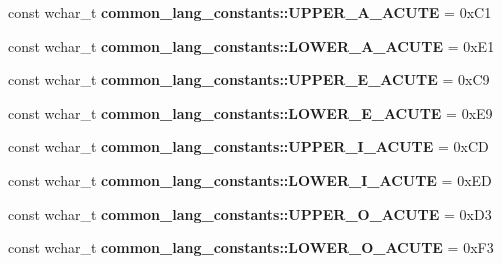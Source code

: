 \begin{DoxyCompactItemize}
\item 
\hypertarget{group___indexing_ga9d4b4564cfe020cc9a9e82f3f5fcd6e4}{const wchar\-\_\-t {\bfseries common\-\_\-lang\-\_\-constants\-::\-U\-P\-P\-E\-R\-\_\-\-A\-\_\-\-A\-C\-U\-T\-E} = 0x\-C1}\label{group___indexing_ga9d4b4564cfe020cc9a9e82f3f5fcd6e4}

\item 
\hypertarget{group___indexing_ga33013dda0d3a80f92d5761d7feb6b049}{const wchar\-\_\-t {\bfseries common\-\_\-lang\-\_\-constants\-::\-L\-O\-W\-E\-R\-\_\-\-A\-\_\-\-A\-C\-U\-T\-E} = 0x\-E1}\label{group___indexing_ga33013dda0d3a80f92d5761d7feb6b049}

\item 
\hypertarget{group___indexing_gae047dd18d206e1d8952572edc413043d}{const wchar\-\_\-t {\bfseries common\-\_\-lang\-\_\-constants\-::\-U\-P\-P\-E\-R\-\_\-\-E\-\_\-\-A\-C\-U\-T\-E} = 0x\-C9}\label{group___indexing_gae047dd18d206e1d8952572edc413043d}

\item 
\hypertarget{group___indexing_ga17d68cd5bb4adb01bbe928e64243b5a5}{const wchar\-\_\-t {\bfseries common\-\_\-lang\-\_\-constants\-::\-L\-O\-W\-E\-R\-\_\-\-E\-\_\-\-A\-C\-U\-T\-E} = 0x\-E9}\label{group___indexing_ga17d68cd5bb4adb01bbe928e64243b5a5}

\item 
\hypertarget{group___indexing_ga5e11641256e1422d64da026565a27491}{const wchar\-\_\-t {\bfseries common\-\_\-lang\-\_\-constants\-::\-U\-P\-P\-E\-R\-\_\-\-I\-\_\-\-A\-C\-U\-T\-E} = 0x\-C\-D}\label{group___indexing_ga5e11641256e1422d64da026565a27491}

\item 
\hypertarget{group___indexing_ga9f74714686d0af143e46579ef04f8e54}{const wchar\-\_\-t {\bfseries common\-\_\-lang\-\_\-constants\-::\-L\-O\-W\-E\-R\-\_\-\-I\-\_\-\-A\-C\-U\-T\-E} = 0x\-E\-D}\label{group___indexing_ga9f74714686d0af143e46579ef04f8e54}

\item 
\hypertarget{group___indexing_gac90440fb63d7a53aca7727ec846f7e77}{const wchar\-\_\-t {\bfseries common\-\_\-lang\-\_\-constants\-::\-U\-P\-P\-E\-R\-\_\-\-O\-\_\-\-A\-C\-U\-T\-E} = 0x\-D3}\label{group___indexing_gac90440fb63d7a53aca7727ec846f7e77}

\item 
\hypertarget{group___indexing_ga36fa07e6a4483a1b72f720434fa4cc3b}{const wchar\-\_\-t {\bfseries common\-\_\-lang\-\_\-constants\-::\-L\-O\-W\-E\-R\-\_\-\-O\-\_\-\-A\-C\-U\-T\-E} = 0x\-F3}\label{group___indexing_ga36fa07e6a4483a1b72f720434fa4cc3b}


\end{DoxyCompactItemize}
